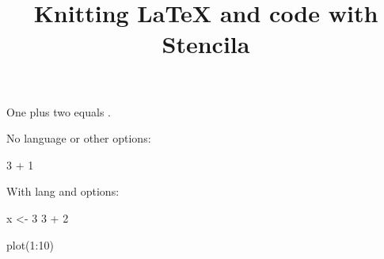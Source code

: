 \documentclass{article}
\begin{document}
\title{Knitting LaTeX and code with Stencila}

One plus two equals .

No language or other options:

\begin{chunk}
3 + 1
\end{chunk}

With lang and options:

\begin{chunk}
x <- 3
3 + 2
\end{chunk}

\begin{chunk}[r,fig.height=6,fig.width=12]
plot(1:10)
\end{chunk}
\end{document}
